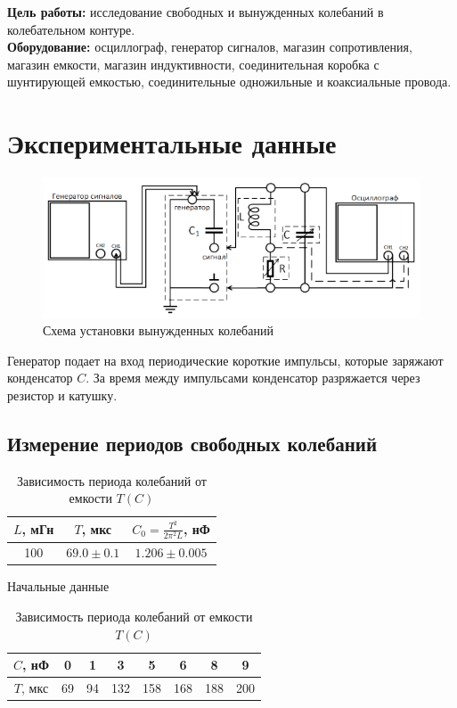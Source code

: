 \textbf{Цель работы:} исследование свободных и вынужденных колебаний в
колебательном контуре.\\\indent
\textbf{Оборудование:} осциллограф, генератор сигналов, магазин сопротивления, магазин емкости, магазин индуктивности, соединительная коробка с шунтирующей емкостью, соединительные одножильные и коаксиальные провода.

\section*{Экспериментальные данные}

\begin{figure}[h!]
    \centering
    \includegraphics[width=12cm]{images/setup.png}
    \caption{Схема установки вынужденных колебаний}
\end{figure}
\indent Генератор подает на вход периодические короткие импульсы, которые заряжают конденсатор $C$. За время между импульсами конденсатор разряжается через резистор и катушку.

\subsection*{Измерение периодов свободных колебаний}

\begin{table}[h!]
    \begin{minipage}{0.4\linewidth}
        \centering
        \begin{tabular}{|c|c|c|}
            \hline
            $L$, мГн  & $T$, мкс & $C_0 = \frac{T^2}{2\pi^2 L}$, нФ\\\hline
            100     & $69.0 \pm 0.1$ & $1.206 \pm 0.005$\\\hline
        \end{tabular}
        \caption{Начальные данные}
    \end{minipage}
    \hfill
    \begin{minipage}{0.7\linewidth}
        \centering
        \begin{tabular}{|c|c|c|c|c|c|c|c|}
            \hline
            $C$, нФ  & 0& 1& 3& 5& 6& 8& 9\\\hline
            $T$, мкс & 69& 94& 132& 158& 168& 188& 200 \\\hline
        \end{tabular}
        \caption{Зависимость периода колебаний от емкости $T(C)$}
    \end{minipage}
\end{table}
\newpage

